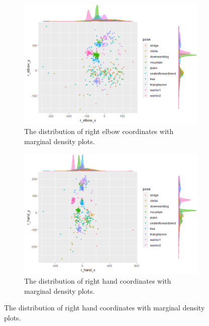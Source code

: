 \documentclass{article}
\begin{document}
\begin{figure}\ContinuedFloat
    \begin{subfigure}[b]{\linewidth}
        \includegraphics[width=0.9\linewidth]{limb-distribution/r_elbow.png}
        \caption{The distribution of right elbow coordinates with marginal density plots.}
        \label{fig: r_elbow}
    \end{subfigure}
    \begin{subfigure}[b]{\linewidth}
        \includegraphics[width=0.9\linewidth]{limb-distribution/r_hand.png}
        \caption{The distribution of right hand coordinates with marginal density plots.}
        \label{fig: r_hand}
    \end{subfigure}
\end{figure}
\end{document}
